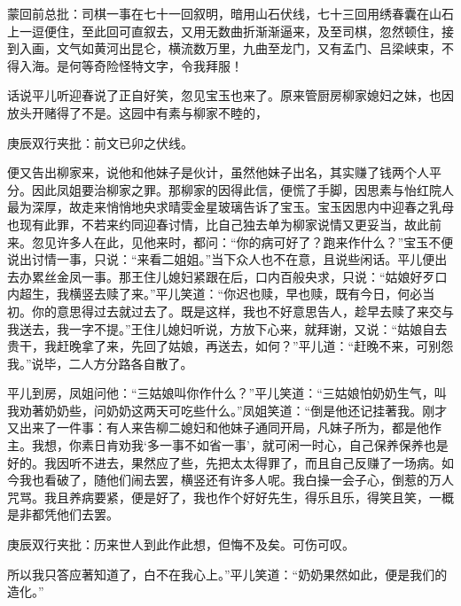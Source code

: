\begin{parag}
    \begin{note}蒙回前总批：司棋一事在七十一回叙明，暗用山石伏线，七十三回用绣春囊在山石上一逗便住，至此回可直叙去，又用无数曲折渐渐逼来，及至司棋，忽然顿住，接到入画，文气如黄河出昆仑，横流数万里，九曲至龙门，又有孟门、吕梁峡束，不得入海。是何等奇险怪特文字，令我拜服！\end{note}
\end{parag}


\begin{parag}
    话说平儿听迎春说了正自好笑，忽见宝玉也来了。原来管厨房柳家媳妇之妹，也因放头开赌得了不是。这园中有素与柳家不睦的，\begin{note}庚辰双行夹批：前文已卯之伏线。\end{note}便又告出柳家来，说他和他妹子是伙计，虽然他妹子出名，其实赚了钱两个人平分。因此凤姐要治柳家之罪。那柳家的因得此信，便慌了手脚，因思素与怡红院人最为深厚，故走来悄悄地央求晴雯金星玻璃告诉了宝玉。宝玉因思内中迎春之乳母也现有此罪，不若来约同迎春讨情，比自己独去单为柳家说情又更妥当，故此前来。忽见许多人在此，见他来时，都问：“你的病可好了？跑来作什么？”宝玉不便说出讨情一事，只说：“来看二姐姐。”当下众人也不在意，且说些闲话。平儿便出去办累丝金凤一事。那王住儿媳妇紧跟在后，口内百般央求，只说：“姑娘好歹口内超生，我横竖去赎了来。”平儿笑道：“你迟也赎，早也赎，既有今日，何必当初。你的意思得过去就过去了。既是这样，我也不好意思告人，趁早去赎了来交与我送去，我一字不提。”王住儿媳妇听说，方放下心来，就拜谢，又说：“姑娘自去贵干，我赶晚拿了来，先回了姑娘，再送去，如何？”平儿道：“赶晚不来，可别怨我。”说毕，二人方分路各自散了。
\end{parag}


\begin{parag}
    平儿到房，凤姐问他：“三姑娘叫你作什么？”平儿笑道：“三姑娘怕奶奶生气，叫我劝著奶奶些，问奶奶这两天可吃些什么。”凤姐笑道：“倒是他还记挂著我。刚才又出来了一件事：有人来告柳二媳妇和他妹子通同开局，凡妹子所为，都是他作主。我想，你素日肯劝我‘多一事不如省一事’，就可闲一时心，自己保养保养也是好的。我因听不进去，果然应了些，先把太太得罪了，而且自己反赚了一场病。如今我也看破了，随他们闹去罢，横竖还有许多人呢。我白操一会子心，倒惹的万人咒骂。我且养病要紧，便是好了，我也作个好好先生，得乐且乐，得笑且笑，一概是非都凭他们去罢。\begin{note}庚辰双行夹批：历来世人到此作此想，但悔不及矣。可伤可叹。\end{note}所以我只答应著知道了，白不在我心上。”平儿笑道：“奶奶果然如此，便是我们的造化。”
\end{parag}



